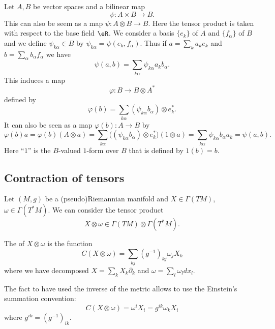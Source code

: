 Let \( A,B\) be vector spaces and a bilinear map
\begin{equation}
	\psi\colon A\times B\to B.
\end{equation}
This can also be seem as a map \( \psi\colon A\otimes B\to B\). Here the tensor product is taken with respect to the base field \( \eR\).
We consider a basis \( \{ e_k \}\) of \( A\) and \( \{ f_{\alpha} \}\) of \( B\) and we define \( \psi_{k\alpha}\in B\) by \( \psi_{k\alpha}=\psi(e_k,f_\alpha)\). Thus if \( a=\sum_ka_ke_k\) and \( b=\sum_{\alpha}b_{\alpha}f_{\alpha}\) we have
\begin{equation}
	\psi(a,b)=\sum_{k\alpha}\psi_{k\alpha}a_kb_\alpha.
\end{equation}
This induces a map
\begin{equation}
	\varphi\colon B\to B\otimes A^*
\end{equation}
defined by
\begin{equation}
	\varphi(b)=\sum_{k\alpha}(\psi_{k\alpha}b_{\alpha})\otimes e_k^*.
\end{equation}
It can also be seen as a map \( \varphi(b)\colon A\to B\) by
\begin{equation}
	\varphi(b)a=\varphi(b)(A\otimes a)=\sum_{k\alpha} \big( (\psi_{k\alpha}b_{\alpha})\otimes e_{k}^*\big)(1\otimes a)=\sum_{k\alpha}\psi_{k\alpha}b_{\alpha}a_k=\psi(a,b).
\end{equation}
Here ``\( 1\)'' is the \( B\)-valued \( 1\)-form over \( B\) that is defined by \( 1(b)=b\).

\subsection{Contraction of tensors}

Let \( (M,g)\) be a (pseudo)Riemannian manifold and \( X\in\Gamma(TM)\), \( \omega\in\Gamma(T^*M)\). We can consider the tensor product
\begin{equation}
	X\otimes \omega\in \Gamma(TM)\otimes \Gamma(T^*M).
\end{equation}
\begin{definition}
	The  of \( X\otimes \omega\) is the function
	\begin{equation}    \label{EQooDODKooOxCzZP}
		C(X\otimes \omega)=\sum_{kj}(g^{-1})_{kj}\omega_jX_k
	\end{equation}
	where we have decomposed \( X=\sum_kX_k\partial_k\) and \( \omega=\sum_l\omega_ldx_l  \).
\end{definition}
The fact to have used the inverse of the metric allows to use the Einstein's summation convention:
\begin{equation}
	C(X\otimes \omega)=\omega^iX_i=g^{ik}\omega_kX_i
\end{equation}
where \( g^{ik}=(g^{-1})_{ik}\).

